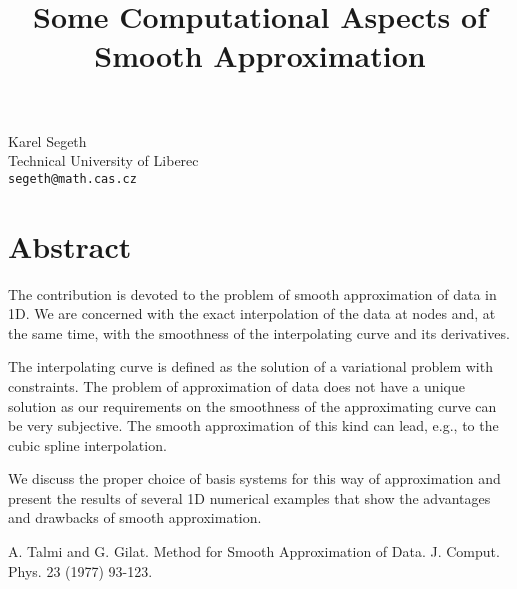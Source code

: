 \title{Some Computational Aspects of Smooth Approximation}
 \author{} \institute{}
\maketitle
\begin{center}
{\large Karel Segeth}\\
Technical University of Liberec\\
{\tt segeth@math.cas.cz}

\end{center}

\section*{Abstract}

The contribution is devoted to the problem of smooth approximation of data in 1D. We are concerned with the exact interpolation of the data at nodes and, at the same time, with the smoothness of the interpolating curve and its derivatives.

The interpolating curve is defined as the solution of a variational problem with constraints. The problem of approximation of data does not have a unique solution as our requirements on the smoothness of the approximating curve can be very subjective. The smooth approximation of this kind can lead, e.g., to the cubic spline interpolation.

We discuss the proper choice of basis systems for this way of approximation and present the results of several 1D numerical examples that show the advantages and drawbacks of smooth approximation.


\begin{thebibliography}{10}

{\sc A. Talmi and G. Gilat}. {Method for Smooth Approximation of Data}. J. Comput. Phys. 23 (1977) 93-123.

\end{thebibliography}
